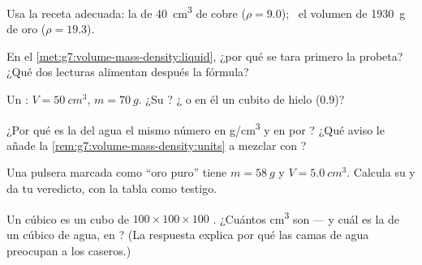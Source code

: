 \begin{exercise}[$\star$]\label{exo:g7:volume-mass-density:3}
Usa la receta adecuada: la  de \qty{40}{cm^3} de cobre
($\rho = 9.0$); \ el volumen de \qty{1930}{g} de oro
($\rho = 19.3$).
\end{exercise}

\begin{exercise}[$\star$]\label{exo:g7:volume-mass-density:4}
En el \cref{met:g7:volume-mass-density:liquid}, ¿por qué se tara
primero la probeta? ¿Qué dos lecturas alimentan después la fórmula?
\end{exercise}

\begin{exercise}[$\star$]\label{exo:g7:volume-mass-density:5}
Un : $V = \qty{50}{cm^3}$, $m = \qty{70}{g}$. ¿Su
? ¿ o  en él un cubito de hielo
($0.9$)?
\end{exercise}

\begin{exercise}[$\star$]\label{exo:g7:volume-mass-density:6}
¿Por qué es la  del agua el mismo número en \unit{g/cm^3}
y en  por ? ¿Qué aviso le añade la
\cref{rem:g7:volume-mass-density:units} a mezclar  con
?
\end{exercise}

\begin{exercise}[$\star$]\label{exo:g7:volume-mass-density:7}
Una pulsera marcada como ``oro puro'' tiene $m = \qty{58}{g}$ y
$V = \qty{5.0}{cm^3}$. Calcula su  y da tu veredicto, con
la tabla como testigo.
\end{exercise}

\begin{exercise}[$\star\star$]\label{exo:g7:volume-mass-density:8}
Un  cúbico es un cubo de $100 \times 100 \times 100$
. ¿Cuántos \unit{cm^3} son --- y cuál es la  de
un  cúbico de agua, en ? (La respuesta explica por
qué las camas de agua preocupan a los caseros.)
\end{exercise}

